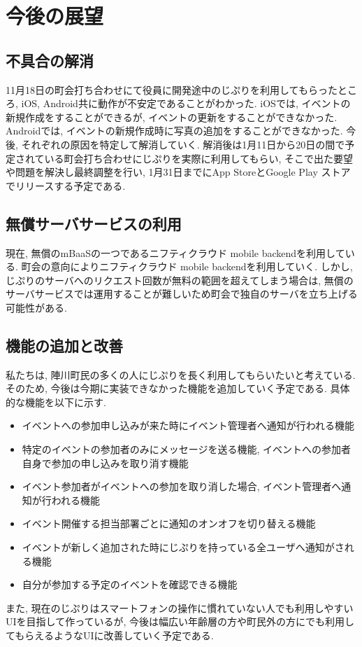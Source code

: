 \chapter{今後の展望}

\section{不具合の解消}
11月18日の町会打ち合わせにて役員に開発途中のじぷりを利用してもらったところ, iOS,  Android共に動作が不安定であることがわかった.
iOSでは, イベントの新規作成をすることができるが, イベントの更新をすることができなかった. Androidでは, イベントの新規作成時に写真の追加をすることができなかった.
今後, それぞれの原因を特定して解消していく. 解消後は1月11日から20日の間で予定されている町会打ち合わせにじぷりを実際に利用してもらい, そこで出た要望や問題を解決し最終調整を行い, 1月31日までにApp StoreとGoogle Play ストアでリリースする予定である.

\section{無償サーバサービスの利用}
現在, 無償のmBaaSの一つであるニフティクラウド mobile backendを利用している. 町会の意向によりニフティクラウド mobile backendを利用していく. しかし, じぷりのサーバへのリクエスト回数が無料の範囲を超えてしまう場合は,
無償のサーバサービスでは運用することが難しいため町会で独自のサーバを立ち上げる可能性がある.

\section{機能の追加と改善}
私たちは, 陣川町民の多くの人にじぷりを長く利用してもらいたいと考えている. そのため, 今後は今期に実装できなかった機能を追加していく予定である. 具体的な機能を以下に示す.
\begin{itemize}
    \item イベントへの参加申し込みが来た時にイベント管理者へ通知が行われる機能
    \item 特定のイベントの参加者のみにメッセージを送る機能, イベントへの参加者自身で参加の申し込みを取り消す機能
    \item イベント参加者がイベントへの参加を取り消した場合, イベント管理者へ通知が行われる機能
    \item イベント開催する担当部署ごとに通知のオンオフを切り替える機能
    \item イベントが新しく追加された時にじぷりを持っている全ユーザへ通知がされる機能
    \item 自分が参加する予定のイベントを確認できる機能
\end{itemize}
また, 現在のじぷりはスマートフォンの操作に慣れていない人でも利用しやすいUIを目指して作っているが,
今後は幅広い年齢層の方や町民外の方にでも利用してもらえるようなUIに改善していく予定である.
